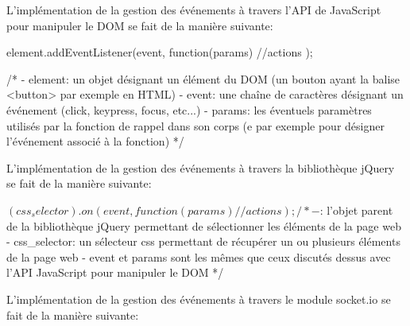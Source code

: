\documentclass[12pt]{report}
\begin{document}
		L'implémentation de la gestion des événements à travers l'API de JavaScript pour manipuler le DOM se fait de la manière suivante:

		\begin{verbatimtab}[4]
			element.addEventListener(event, function(params){
				//actions
			});

			/*
				- element: un objet désignant un élément du DOM
				(un bouton ayant la balise <button> par exemple en HTML)
				- event: une chaîne de caractères désignant un événement
				(click, keypress, focus, etc...)
				- params: les éventuels paramètres utilisés par la fonction
				de rappel dans son corps
				(e par exemple pour désigner l'événement associé à la fonction)
			*/
		\end{verbatimtab}

		L'implémentation de la gestion des événements à travers la bibliothèque jQuery se fait de la manière suivante:

		\begin{verbatimtab}[4]
			$(css_selector).on(event, function(params){
				//actions
			});

			/*
				- $: l'objet parent de la bibliothèque jQuery permettant de
				sélectionner les éléments de la page web
				- css_selector: un sélecteur css permettant de récupérer un
				ou plusieurs éléments de la page web
				- event et params sont les mêmes que ceux discutés
				dessus avec l'API JavaScript pour manipuler le DOM
			*/
		\end{verbatimtab}

		L'implémentation de la gestion des événements à travers le module socket.io se fait de la manière suivante:
\end{document}
